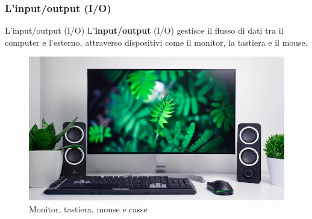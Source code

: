 \subsubsection[L'input/output (I/O)]{L'input/output (I/O)}
\begin{frame}
	
	\begin{block}{L'input/output (I/O)} 
		L'\textbf{input/output} (I/O) gestisce il flusso di dati tra il computer e l'esterno, attraverso dispositivi come il monitor, la tastiera e il mouse.
	\end{block}
	
	\begin{figure}[!htbp] 
		\centering
		\includegraphics[width=0.8\linewidth]{images/3_architetture/io.jpg}
		\caption{Monitor, tastiera, mouse e casse}
		\label{fig:architectures_io}
	\end{figure}
	 
\end{frame}


